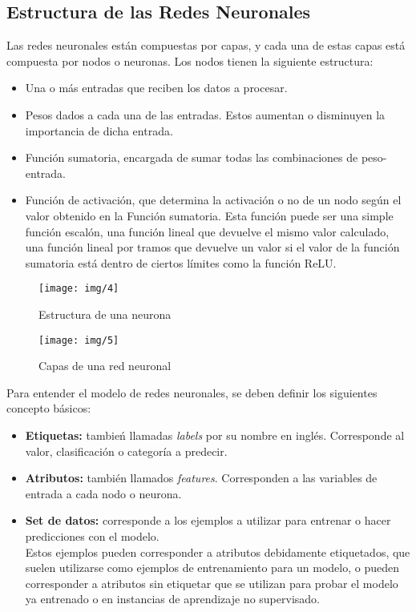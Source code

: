 \subsection{Estructura de las Redes Neuronales}

Las redes neuronales están compuestas por capas, y cada una de estas capas está compuesta por nodos o neuronas.
Los nodos tienen la siguiente estructura:
\begin{itemize}
    \item Una o más entradas que reciben los datos a procesar.
    \item Pesos dados a cada una de las entradas. Estos aumentan o disminuyen la importancia de dicha entrada.
    \item Función sumatoria, encargada de sumar todas las combinaciones de peso-entrada.
    \item Función de activación, que determina la activación o no de un nodo según el valor obtenido en la Función sumatoria.
            Esta función puede ser una simple función escalón, una función lineal que devuelve el mismo valor calculado, una
            función lineal por tramos que devuelve un valor si el valor de la función sumatoria está dentro de ciertos límites
            como la función ReLU.
\end{itemize}

\begin{figure}[H]
    \texttt{[image: img/4]}
    \centering
    \caption{Estructura de una neurona}
    \label{4}
\end{figure}

\begin{figure}[H]
    \texttt{[image: img/5]}
    \centering
    \caption{Capas de una red neuronal}
    \label{5}
\end{figure}


Para entender el modelo de redes neuronales, se deben definir los siguientes concepto básicos:
\begin{itemize}
    \item \textbf{Etiquetas:} tambień llamadas \emph{labels} por su nombre en inglés. Corresponde al valor, clasificación
            o categoría a predecir.
    \item \textbf{Atributos:} también llamados \emph{features}. Corresponden a las variables de entrada a cada nodo o neurona.
    \item \textbf{Set de datos:} corresponde a los ejemplos a utilizar para entrenar o hacer predicciones con el modelo.\\
                Estos ejemplos pueden corresponder a atributos debidamente etiquetados, que suelen utilizarse como ejemplos de
                entrenamiento para un modelo, o pueden corresponder a atributos sin etiquetar que se utilizan para probar
                el modelo ya entrenado o en instancias de aprendizaje no supervisado.
\end{itemize}


